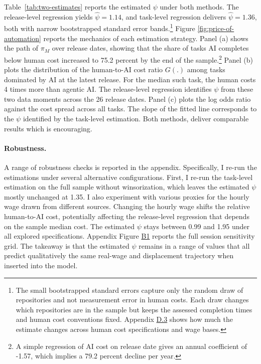 \documentclass[11pt]{article}
\begin{document}
Table~\ref{tab:two-estimates} reports the estimated $\psi$ under
both methods. The release-level regression yields $\widehat{\psi}=1.14$,
and task-level regression delivers $\widehat{\psi}=1.36$,
both with narrow bootstrapped standard error bands.\footnote{The small bootstrapped standard errors capture only the random draw
of repositories and not measurement error in human costs. Each draw
changes which repositories are in the sample but keeps the assessed
completion times and human cost conventions fixed. Appendix \href{https://ahmadlp.github.io/Lashkaripour_AI_Displacement_Online_Appendix.pdf\#page=105}{D.3}
shows how much the estimate changes across human cost specifications
and wage bases.} Figure \ref{fig:price-of-automation} reports the mechanics of each
estimation strategy. Panel (a) shows the path of $\pi_{M}$ over release
dates, showing that the share of tasks AI completes below human cost
increased to 75.2 percent by the end of
the sample.\footnote{A simple regression of AI cost on release date gives an annual coefficient
of -1.57, which implies a 79.2
percent decline per year.} Panel (b) plots the distribution of the human-to-AI cost ratio $G(.)$
among tasks dominated by AI at the latest release. For the median
such task, the human costs 4 times
more than agentic AI. The release-level regression identifies $\psi$
from these two data moments across the 26 release
dates. Panel (c) plots the log odds ratio against the cost spread
across all tasks. The slope of the fitted line corresponds to the
$\psi$ identified by the task-level estimation. Both methods, deliver
comparable results which is encouraging.

\paragraph{Robustness.}

A range of robustness checks is reported in the appendix. Specifically,
I re-run the estimations under several alternative configurations.
First, I re-run the task-level estimation on the full sample without
winsorization, which leaves the estimated $\psi$ mostly unchanged
at 1.35. I also experiment with various
proxies for the hourly wage drawn from different sources. Changing
the hourly wage shifts the relative human-to-AI cost, potentially
affecting the release-level regression that depends on the sample
median cost. The estimated $\psi$ stays between 0.99
and 1.95 under all explored specifications. Appendix
Figure \href{https://ahmadlp.github.io/Lashkaripour_AI_Displacement_Online_Appendix.pdf\#page=106}{B1} reports the full session sensitivity
grid. The takeaway is that the estimated $\psi$ remains in a range
of values that all predict qualitatively the same real-wage and displacement
trajectory when inserted into the model.
\end{document}
